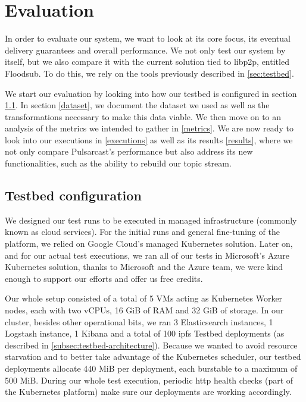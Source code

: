 
\chapter{Evaluation}
\label{chapter:evaluation}


In order to evaluate our system, we want to look at its core focus, its
eventual delivery guarantees and overall performance. We not only test our
system by itself, but we also compare it with the current solution tied to
libp2p, entitled Floodsub. To do this, we rely on the tools previously
described in \ref{sec:testbed}.

We start our evaluation by looking into how our testbed is configured in
section \ref{testbed-configuration}. In section \ref{dataset}, we document the
dataset we used as well as the transformations necessary to make this data
viable. We then move on to an analysis of the metrics we intended to gather in
\ref{metrics}. We are now ready to look into our executions in \ref{executions}
as well as its results \ref{results}, where we not only compare Pulsarcast's
performance but also address its new functionalities, such as the ability to
rebuild our topic stream.

\section{Testbed configuration}\label{testbed-configuration}

We designed our test runs to be executed in managed infrastructure (commonly
known as cloud services). For the initial runs and general fine-tuning of the
platform, we relied on Google Cloud's managed Kubernetes solution. Later on,
and for our actual test executions, we ran all of our tests in Microsoft's
Azure Kubernetes solution, thanks to Microsoft and the Azure team, we were kind
enough to support our efforts and offer us free credits.

Our whole setup consisted of a total of 5 VMs acting as Kubernetes Worker
nodes, each with two vCPUs, 16 GiB of RAM and 32 GiB of storage. In our
cluster, besides other operational bits, we ran 3 Elasticsearch instances, 1
Logstash instance, 1 Kibana and a total of 100 \acrshort{ipfs} Testbed
deployments (as described in \ref{subsec:testbed-architecture}). Because we
wanted to avoid resource starvation and to better take advantage of the
Kubernetes scheduler, our testbed deployments allocate 440 MiB per deployment,
each burstable to a maximum of 500 MiB. During our whole test execution,
periodic \acrshort{http} health checks (part of the Kubernetes platform) make
sure our deployments are working accordingly.

